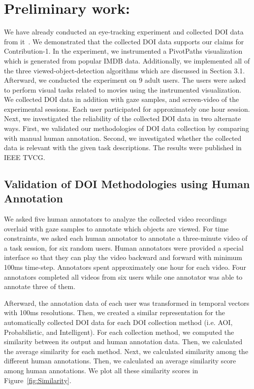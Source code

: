 \chapter{Preliminary work:}
We have already conducted an eye-tracking experiment and collected DOI data from it~\cite{Ala16}. We demonstrated that the collected DOI data supports our claims for Contribution-1. In the experiment, we instrumented a PivotPaths visualization which is generated from popular IMDB data. Additionally, we implemented all of the three viewed-object-detection algorithms which are discussed in Section 3.1. Afterward, we conducted the experiment on 9 adult users. The users were asked to perform visual tasks related to movies using the instrumented visualization. We collected DOI data in addition with gaze samples, and screen-video of the experimental sessions. Each user participated for approximately one hour session. Next, we investigated the reliability of the collected DOI data in two alternate ways. First, we validated our methodologies of DOI data collection by comparing with manual human annotation. Second, we investigated whether the collected data is relevant with the given task descriptions. The results were published in IEEE TVCG. 

\section{Validation of DOI Methodologies using Human Annotation}
We asked five human annotators to analyze the collected video recordings overlaid with gaze samples to annotate which objects are viewed. For time constraints, we asked each human annotator to annotate a three-minute video of a task session, for six random users. Human annotators were provided a special interface so that they can play the video backward and forward with minimum 100ms time-step. Annotators spent approximately one hour for each video. Four annotators completed all videos from six users while one annotator was able to annotate three of them. 

Afterward, the annotation data of each user was transformed in temporal vectors with 100ms resolutions. Then, we created a similar representation for the automatically collected DOI data for each DOI collection method (i.e. AOI, Probabilistic, and Intelligent).  For each collection method, we computed the similarity between its output and human annotation data. Then, we calculated the average similarity for each method. Next, we calculated similarity among the different human annotations. Then, we calculated an average similarity score among human annotations. We plot all these similarity scores in Figure~\ref{fig:Similarity}. 

